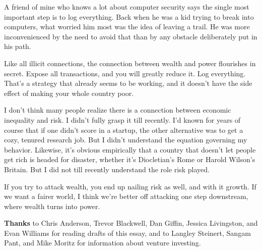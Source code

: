 A friend of mine who knows a lot about computer security says the single
most important step is to log everything. Back when he was a kid trying
to break into computers, what worried him most was the idea of leaving a
trail. He was more inconvenienced by the need to avoid that than by any
obstacle deliberately put in his path.

Like all illicit connections, the connection between wealth and power
flourishes in secret. Expose all transactions, and you will greatly
reduce it. Log everything. That's a strategy that already seems to be
working, and it doesn't have the side effect of making your whole
country poor.

I don't think many people realize there is a connection between economic
inequality and risk. I didn't fully grasp it till recently. I'd known
for years of course that if one didn't score in a startup, the other
alternative was to get a cozy, tenured research job. But I didn't
understand the equation governing my behavior. Likewise, it's obvious
empirically that a country that doesn't let people get rich is headed
for disaster, whether it's Diocletian's Rome or Harold Wilson's Britain.
But I did not till recently understand the role risk played.

If you try to attack wealth, you end up nailing risk as well, and with
it growth. If we want a fairer world, I think we're better off attacking
one step downstream, where wealth turns into power.


\textbf{Thanks} to Chris Anderson, Trevor Blackwell, Dan Giffin, Jessica
Livingston, and Evan Williams for reading drafts of this essay, and to
Langley Steinert, Sangam Pant, and Mike Moritz for information about
venture investing.